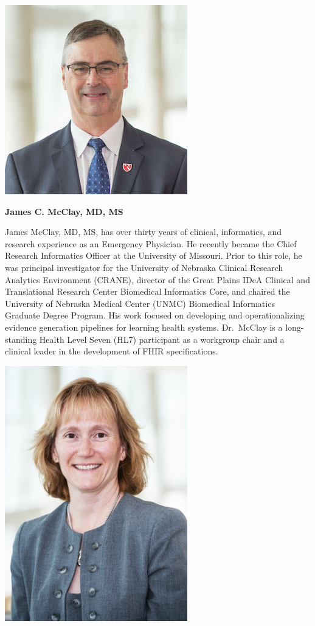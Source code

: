 \documentclass[
]{journal}
\begin{document}
\begin{flushleft}\includegraphics[width=0.5\linewidth]{assets/biography/jim_mcclay} \end{flushleft}

\textbf{James C. McClay, MD, MS}

James McClay, MD, MS, has over thirty years of clinical, informatics, and research experience as an Emergency Physician. He recently became the Chief Research Informatics Officer at the University of Missouri. Prior to this role, he was principal investigator for the University of Nebraska Clinical Research Analytics Environment (CRANE), director of the Great Plains IDeA Clinical and Translational Research Center Biomedical Informatics Core, and chaired the University of Nebraska Medical Center (UNMC) Biomedical Informatics Graduate Degree Program. His work focused on developing and operationalizing evidence generation pipelines for learning health systems. Dr.~McClay is a long-standing Health Level Seven (HL7) participant as a workgroup chair and a clinical leader in the development of FHIR specifications.

\begin{flushleft}\includegraphics[width=0.5\linewidth]{assets/biography/carol_geary} \end{flushleft}
\end{document}
